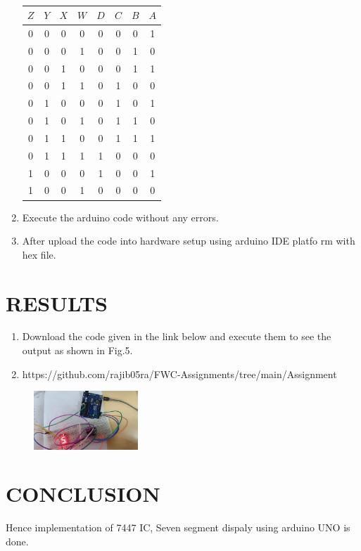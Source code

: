 \documentclass[conference]{IEEEtran}
\begin{document}
\begin{enumerate}
				\begin{table}[htbp]
				    \centering
				    \begin{tabular}
				    { | c | c | c | c | c | c | c | c | } \hline
				    $Z$ & $Y$ & $X$ & $W$ & $D$ & $C$ & $B$ & $A$\\\hline
				    0   & 0   & 0   & 0   & 0  & 0 & 0  & 1 \\
				    0   & 0   & 0   & 1   & 0  & 0 & 1  & 0 \\
				    0   & 0   & 1   & 0   & 0  & 0 & 1  & 1 \\
				    0   & 0   & 1   & 1   & 0  & 1 & 0  & 0 \\
				    0   & 1   & 0   & 0   & 0  & 1 & 0  & 1 \\
				    0   & 1   & 0   & 1   & 0  & 1 & 1  & 0 \\
				    0   & 1   & 1   & 0   & 0  & 1 & 1  & 1 \\                              0   & 1   & 1   & 1   & 1  & 0 & 0  & 0 \\
				    1   & 0   & 0   & 0   & 1  & 0 & 0  & 1 \\
				    1   & 0   & 0   & 1   & 0  & 0 & 0  & 0 \\ \hline
				    \end{tabular}
				    \vspace{0.15cm}
				    \caption{\label{tab:widgets}}
				    \end{table}                                                            \item Execute the arduino code without any errors.
				    \item After upload the code into hardware setup using arduino IDE platfo
				    rm with hex file.
				     \end{enumerate}     
				     \section{RESULTS}
				      \begin{enumerate}
				               \item Download the code given in the link below and execute them to see the output as shown in Fig.5.
					                \item https://github.com/rajib05ra/FWC-Assignments/tree/main/Assignment
							 \end{enumerate}
							         \begin{figure}[h]
								         \centering
									         \includegraphics[width=0.35\textwidth]{bcdr.jpg}                                                     \caption{\label{fig:Gates}}
										 \end{figure}
										 \section{CONCLUSION}
										 Hence implementation of 7447 IC, Seven segment dispaly using arduino UNO is done.
										 
\end{document}

